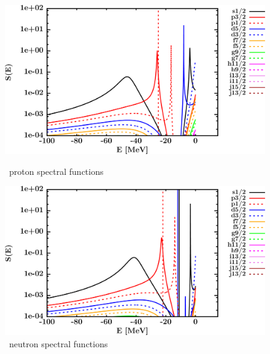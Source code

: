 \begin{figure}[hbtp]
    \centering
    \begin{minipage}{0.42\textwidth}
        \centering
        \includegraphics[width=\textwidth]{figures/o18_protonSpectralFunctions.png}
        \caption*{\oEight\ proton spectral functions}
        \label{DOMFitData_o18_proton_spectralFunctions}
    \end{minipage}\hspace{6pt}
    \begin{minipage}{0.42\textwidth}
        \centering
        \includegraphics[width=\linewidth]{figures/o18_neutronSpectralFunctions.png}
        \caption*{\oEight\ neutron spectral functions}
        \label{DOMFitData_o18_neutron_spectralFunctions}
    \end{minipage}
\end{figure}
\afterpage{\clearpage}
